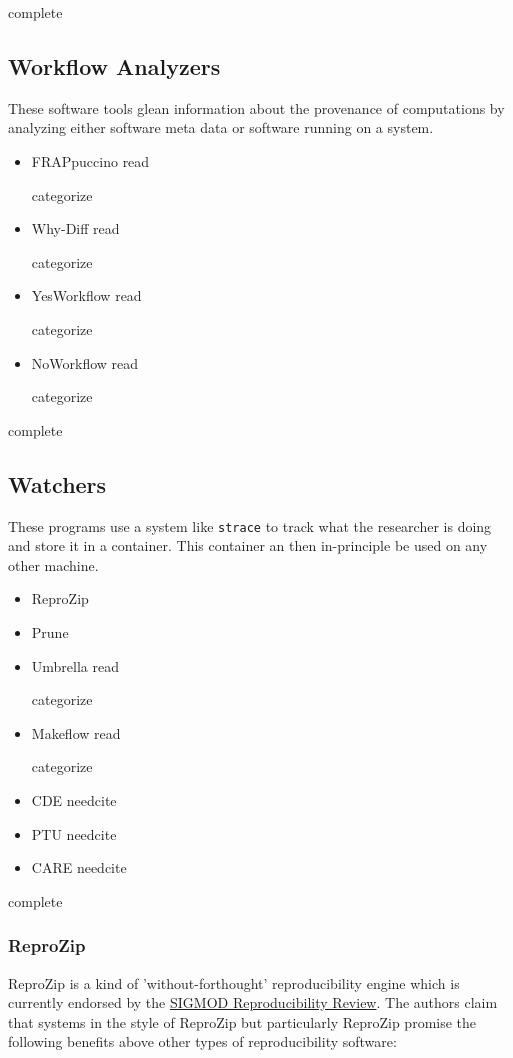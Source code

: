 \documentclass[american]{article}
\newcommand{\Read}{
	\gls{read}
}
\newcommand{\categorize}{
	\gls{categorize}
}
\newcommand{\complete}{
	\gls{complete}
}
\newcommand{\needcite}{
	\gls{needcite}
}
\begin{document}
\complete

\subsection{Workflow Analyzers}

These software tools glean information about the provenance of computations by analyzing either software meta data or software running on a system.

\begin{itemize}
\item FRAPpuccino \cite{FRAPpuccino} \Read \categorize
\item Why-Diff \cite{computational-meta-data} \Read \categorize
\item YesWorkflow \cite{computational-meta-data} \Read \categorize
\item NoWorkflow \cite{computational-meta-data} \Read \categorize
\end{itemize}

\complete

\subsection{Watchers}

These programs use a system like \texttt{strace} to track what the researcher is doing and store it in a container. This container an then in-principle be used on any other machine.

\begin{itemize}
\item ReproZip \cite{reprozip}
\item Prune \cite{Thain-Prune-2016}
\item Umbrella \cite{Thain-Umbrella-2016} \Read \categorize
\item Makeflow \cite{makeflow-2017} \Read \categorize
\item CDE \needcite
\item PTU \needcite
\item CARE \needcite
\end{itemize}

\complete

\subsubsection{ReproZip} \label{sec:reprozip}

ReproZip is a kind of 'without-forthought' reproducibility engine which is currently endorsed by the \href{http://db-reproducibility.seas.harvard.edu/}{SIGMOD Reproducibility Review}. The authors claim that systems in the style of ReproZip but particularly ReproZip promise the following benefits above other types of reproducibility software\cite{reprozip}:
\end{document}

